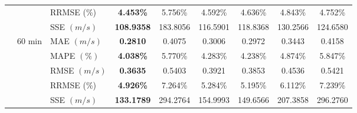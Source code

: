 {\begin{longtable}[htb!]{lllcccccc}
 &  & {RRMSE {(\%)}} & {\textbf{4.453\%}} & {5.756\%} & {4.592\%} & {4.636\%} & {4.843\%} & {4.752\%} \\
 &  & {SSE {$(m/s)$}} & {\textbf{108.9358}} & {183.8056} & {116.5901} & {118.8368} & {130.2566} & {124.6580} \\
 & \multicolumn{1}{c}{60 min} & MAE {$(m/s)$} & \textbf{0.2810} & 0.4075 & 0.3006 & 0.2972 & 0.3443 & {0.4158} \\
 &  & MAPE {$(\%)$} & \textbf{4.038\%} & 5.770\% & 4.283\% & 4.238\% & 4.874\% & {5.847\%} \\
 &  & RMSE {$(m/s)$} & \textbf{0.3635} & 0.5403 & 0.3921 & 0.3853 & 0.4536 & {0.5421} \\
 &  & {RRMSE {(\%)}} & {\textbf{4.926\%}} & {7.264\%} & {5.284\%} & {5.195\%} & {6.112\%} & {7.239\%} \\
 &  & {SSE {$(m/s)$}} & {\textbf{133.1789}} & {294.2764} & {154.9993} & {149.6566} & {207.3858} & {296.2760} \\ \hline
\end{longtable}
}